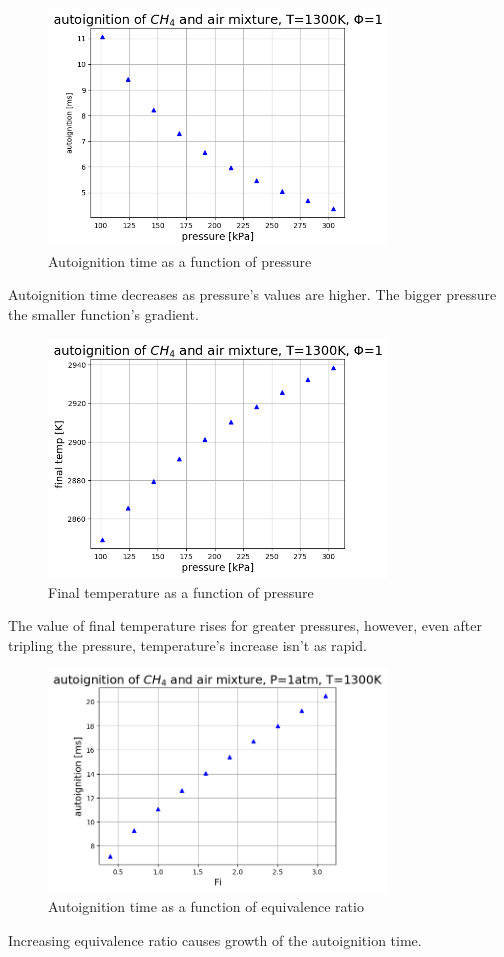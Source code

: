 \documentclass[a4paper]{article}
\begin{document}
\begin{figure}[H]
\centering
\includegraphics[width=0.8\textwidth]{autoignition_pressure.png}
\caption{Autoignition time as a function of pressure}
\end{figure}
Autoignition time decreases as pressure's values are higher. The bigger pressure the smaller function's gradient.

\begin{figure}[H]
\centering
\includegraphics[width=0.8\textwidth]{finaltemp_pressure.png}
\caption{Final temperature as a function of pressure}
\end{figure}
The value of final temperature rises for greater pressures, however, even after tripling the pressure, temperature's increase isn't as rapid.

\begin{figure}[H]
\centering
\includegraphics[width=0.8\textwidth]{autoignition_Fi.png}
\caption{Autoignition time as a function of equivalence ratio}
\end{figure}
Increasing equivalence ratio causes growth of the autoignition time.
\end{document}
